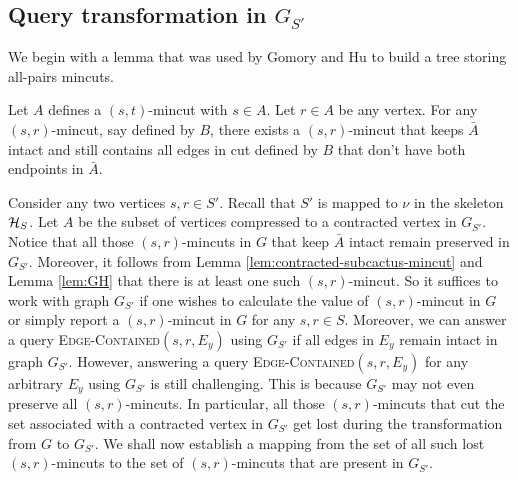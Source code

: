 \vspace{-8mm}
\subsection{Query transformation in \texorpdfstring{$G_{S'}$}{compact graph}}

We begin with a lemma that was used by Gomory and Hu to build a tree storing all-pairs mincuts. 

\begin{lemma}
Let $A$ defines a $(s,t)$-mincut with $s\in A$. Let $r\in A$ be any vertex.
For any $(s,r)$-mincut, say defined by $B$, there exists a $(s,r)$-mincut that keeps $\bar A$ intact and still contains all edges in cut defined by $B$ that don't have both endpoints in $\bar A$.
\label{lem:GH}
\end{lemma}

Consider any two vertices $s,r\in S'$. Recall that $S'$ is mapped to $\nu$ in the skeleton ${\cal H}_S$. 
Let $A$ be the subset of vertices compressed to a contracted vertex in $G_{S'}$. Notice that all those $(s,r)$-mincuts in $G$ that keep $\bar{A}$ intact remain preserved in $G_{S'}$. Moreover, it follows from Lemma \ref{lem:contracted-subcactus-mincut} and Lemma \ref{lem:GH} that there is at least one such $(s,r)$-mincut. So it suffices to work with graph $G_{S'}$ if one wishes to calculate the value of $(s,r)$-mincut in $G$ or simply report a $(s,r)$-mincut in $G$
for any $s,r\in S$. Moreover, we can answer a query \textsc{Edge-Contained}$(s,r,E_y)$ using $G_{S'}$ if all edges in $E_y$ remain intact in graph $G_{S'}$. 
However, answering a query \textsc{Edge-Contained}$(s,r,E_{y})$ for any arbitrary $E_y$ using $G_{S'}$ is still challenging. This is because 
$G_{S'}$ may not even preserve all $(s,r)$-mincuts. In particular, all those $(s,r)$-mincuts that cut the set associated with a contracted vertex in $G_{S'}$ get lost during the transformation from $G$ to $G_{S'}$. We shall now establish a mapping from the set of all such lost $(s,r)$-mincuts to the set of $(s,r)$-mincuts that are present in $G_{S'}$. 

